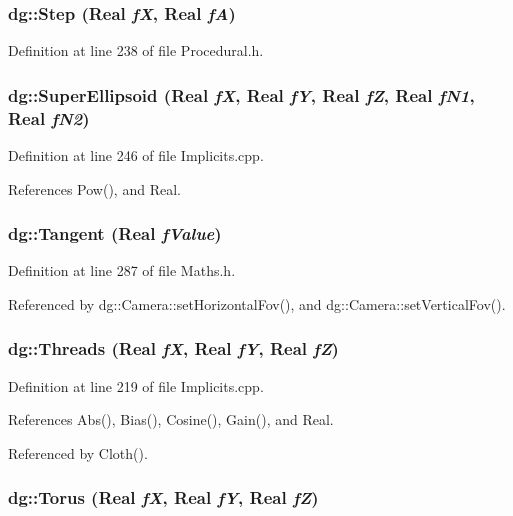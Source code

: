 \subsubsection{ dg::Step ({\bf Real} {\em f\-X}, {\bf Real} {\em f\-A})\hspace{0.3cm}{\tt  [inline]}}\label{namespacedg_a109}




Definition at line 238 of file Procedural.h.
\subsubsection{ dg::Super\-Ellipsoid ({\bf Real} {\em f\-X}, {\bf Real} {\em f\-Y}, {\bf Real} {\em f\-Z}, {\bf Real} {\em f\-N1}, {\bf Real} {\em f\-N2})}\label{namespacedg_a73}




Definition at line 246 of file Implicits.cpp.

References Pow(), and Real.
\subsubsection{ dg::Tangent ({\bf Real} {\em f\-Value})\hspace{0.3cm}{\tt  [inline]}}\label{namespacedg_a117}




Definition at line 287 of file Maths.h.

Referenced by dg::Camera::set\-Horizontal\-Fov(), and dg::Camera::set\-Vertical\-Fov().
\subsubsection{ dg::Threads ({\bf Real} {\em f\-X}, {\bf Real} {\em f\-Y}, {\bf Real} {\em f\-Z})}\label{namespacedg_a70}




Definition at line 219 of file Implicits.cpp.

References Abs(), Bias(), Cosine(), Gain(), and Real.

Referenced by Cloth().
\subsubsection{ dg::Torus ({\bf Real} {\em f\-X}, {\bf Real} {\em f\-Y}, {\bf Real} {\em f\-Z})}\label{namespacedg_a66}




